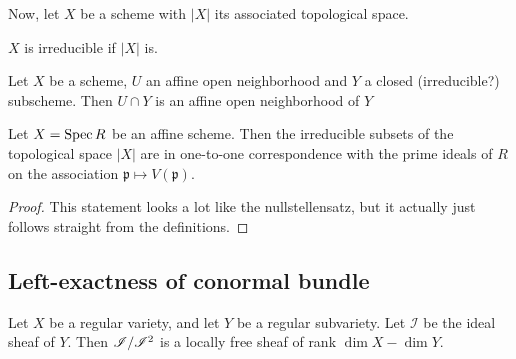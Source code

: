 Now, let $X$ be a scheme with $|X|$ its associated
topological space.

\begin{definition}
  \label{def:irred_scheme}
  $X$ is irreducible if $|X|$ is.
\end{definition}

\begin{lemma}
  \label{lem:affine_cap_irred_is_affine}
  Let $X$ be a scheme, $U$ an affine open 
  neighborhood and $Y$ a closed (irreducible?) subscheme.
  Then $U \cap Y$ is an affine open neighborhood
  of $Y$
\end{lemma}

\begin{proposition}
  \label{prop:scheme_definullstellensatz}
  Let $X = \operatorname{Spec} R$ be an affine scheme.
  Then the irreducible subsets of the
  topological space $|X|$ are in one-to-one
  correspondence with the prime ideals of
  $R$ on the association 
  $\mathfrak{p} \mapsto V(\mathfrak{p})$.
\end{proposition}

\begin{proof}
  This statement looks a lot like the nullstellensatz,
  but it actually just follows straight from the
  definitions.
\end{proof}

\subsection{Left-exactness of conormal bundle}


\begin{lemma}
  \label{lem:reg_subvar_conormal_locally_free}
  Let $X$ be a regular variety, and let $Y$ be a regular
  subvariety.
  Let $\mathcal{I}$ be the ideal sheaf of $Y$.
  Then $\mathscr{I} / \mathscr{I}^{2}$ is a locally free sheaf of rank 
  $\dim X - \dim Y$.
\end{lemma}


